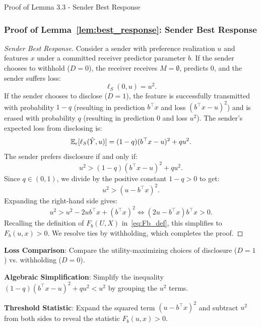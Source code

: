 \begin{sourceblock}{Proof of Lemma 3.3 - Sender Best Response}
\subsubsection*{Proof of Lemma~\ref{lem:best_response}: Sender Best Response}
\label{app:proof_best_response}
\begin{proof}[Sender Best Response]
Consider a sender with preference realization $u$ and features $x$ under a committed receiver predictor parameter $b$. 
If the sender chooses to withhold ($D = 0$), the receiver receives $M = \emptyset$, predicts $0$, and the sender suffers loss:
\begin{equation}
    \ell_S(0, u) = u^2.
\end{equation}
If the sender chooses to disclose ($D = 1$), the feature is successfully transmitted with probability $1 - q$ (resulting in prediction $b^\top x$ and loss $(b^\top x - u)^2$) and is erased with probability $q$ (resulting in prediction $0$ and loss $u^2$). The sender's expected loss from disclosing is:
\begin{equation}
    \mathbb{E}_{\epsilon}[\ell_S(\hat{Y}, u)] = (1 - q)(b^\top x - u)^2 + q u^2.
\end{equation}
The sender prefers disclosure if and only if:
\begin{equation}
    u^2 > (1 - q)(b^\top x - u)^2 + q u^2.
\end{equation}
Since $q \in (0, 1)$, we divide by the positive constant $1 - q > 0$ to get:
\begin{equation}
    u^2 > (u - b^\top x)^2.
\end{equation}
Expanding the right-hand side gives:
\begin{equation}
    u^2 > u^2 - 2u b^\top x + (b^\top x)^2 \iff (2u - b^\top x)b^\top x > 0.
\end{equation}
Recalling the definition of $F_b(U, X)$ in~\eqref{eq:Fb_def}, this simplifies to $F_b(u, x) > 0$. We resolve ties by withholding, which completes the proof.
\end{proof}
\end{sourceblock}

\begin{guideblock}
\item \textbf{Loss Comparison}: Compare the utility-maximizing choices of disclosure ($D=1$) vs. withholding ($D=0$).
\item \textbf{Algebraic Simplification}: Simplify the inequality $(1-q)(b^\top x - u)^2 + q u^2 < u^2$ by grouping the $u^2$ terms.
\item \textbf{Threshold Statistic}: Expand the squared term $(u - b^\top x)^2$ and subtract $u^2$ from both sides to reveal the statistic $F_b(u, x) > 0$.
\end{guideblock}


